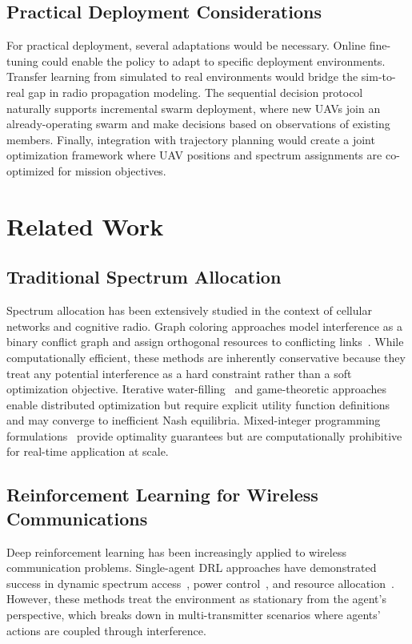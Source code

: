 \documentclass[conference]{IEEEtran}
\begin{document}
\subsection{Practical Deployment Considerations}

For practical deployment, several adaptations would be necessary. Online fine-tuning could enable the policy to adapt to specific deployment environments. Transfer learning from simulated to real environments would bridge the sim-to-real gap in radio propagation modeling. The sequential decision protocol naturally supports incremental swarm deployment, where new UAVs join an already-operating swarm and make decisions based on observations of existing members. Finally, integration with trajectory planning would create a joint optimization framework where UAV positions and spectrum assignments are co-optimized for mission objectives.

\section{Related Work}

\subsection{Traditional Spectrum Allocation}

Spectrum allocation has been extensively studied in the context of cellular networks and cognitive radio. Graph coloring approaches model interference as a binary conflict graph and assign orthogonal resources to conflicting links~\cite{ref_graph_coloring1,ref_graph_coloring2}. While computationally efficient, these methods are inherently conservative because they treat any potential interference as a hard constraint rather than a soft optimization objective. Iterative water-filling~\cite{ref_iterative_waterfilling} and game-theoretic approaches~\cite{ref_game_theory_spectrum} enable distributed optimization but require explicit utility function definitions and may converge to inefficient Nash equilibria. Mixed-integer programming formulations~\cite{ref_central_opt1} provide optimality guarantees but are computationally prohibitive for real-time application at scale.

\subsection{Reinforcement Learning for Wireless Communications}

Deep reinforcement learning has been increasingly applied to wireless communication problems. Single-agent DRL approaches have demonstrated success in dynamic spectrum access~\cite{ref_drl_spectrum_access1,ref_drl_spectrum_access2}, power control~\cite{ref_drl_power_control}, and resource allocation~\cite{ref_drl_resource_alloc}. However, these methods treat the environment as stationary from the agent's perspective, which breaks down in multi-transmitter scenarios where agents' actions are coupled through interference.
\end{document}
